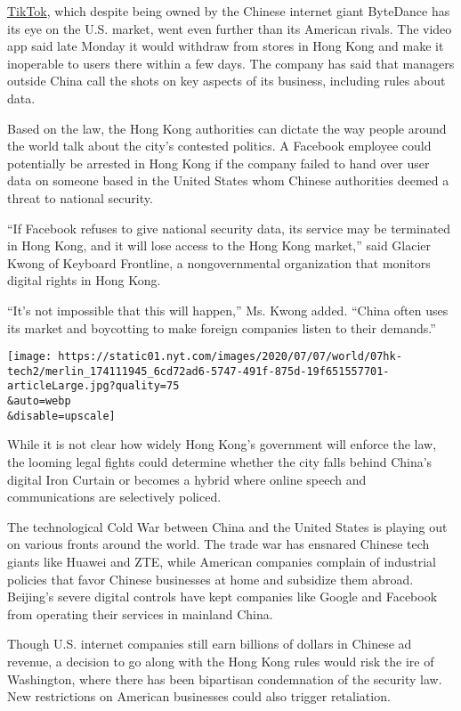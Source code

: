 \href{https://www.nytimes.com/2020/07/06/technology/tiktok-google-facebook-twitter-hong-kong.html}{TikTok},
which despite being owned by the Chinese internet giant ByteDance has
its eye on the U.S. market, went even further than its American rivals.
The video app said late Monday it would withdraw from stores in Hong
Kong and make it inoperable to users there within a few days. The
company has said that managers outside China call the shots on key
aspects of its business, including rules about data.

Based on the law, the Hong Kong authorities can dictate the way people
around the world talk about the city's contested politics. A Facebook
employee could potentially be arrested in Hong Kong if the company
failed to hand over user data on someone based in the United States whom
Chinese authorities deemed a threat to national security.

``If Facebook refuses to give national security data, its service may be
terminated in Hong Kong, and it will lose access to the Hong Kong
market,'' said Glacier Kwong of Keyboard Frontline, a nongovernmental
organization that monitors digital rights in Hong Kong.

``It's not impossible that this will happen,'' Ms. Kwong added. ``China
often uses its market and boycotting to make foreign companies listen to
their demands.''

\texttt{[image: https://static01.nyt.com/images/2020/07/07/world/07hk-tech2/merlin\_174111945\_6cd72ad6-5747-491f-875d-19f651557701-articleLarge.jpg?quality=75\\\&auto=webp\\\&disable=upscale]}

While it is not clear how widely Hong Kong's government will enforce the
law, the looming legal fights could determine whether the city falls
behind China's digital Iron Curtain or becomes a hybrid where online
speech and communications are selectively policed.

The technological Cold War between China and the United States is
playing out on various fronts around the world. The trade war has
ensnared Chinese tech giants like Huawei and ZTE, while American
companies complain of industrial policies that favor Chinese businesses
at home and subsidize them abroad. Beijing's severe digital controls
have kept companies like Google and Facebook from operating their
services in mainland China.

Though U.S. internet companies still earn billions of dollars in Chinese
ad revenue, a decision to go along with the Hong Kong rules would risk
the ire of Washington, where there has been bipartisan condemnation of
the security law. New restrictions on American businesses could also
trigger retaliation.

